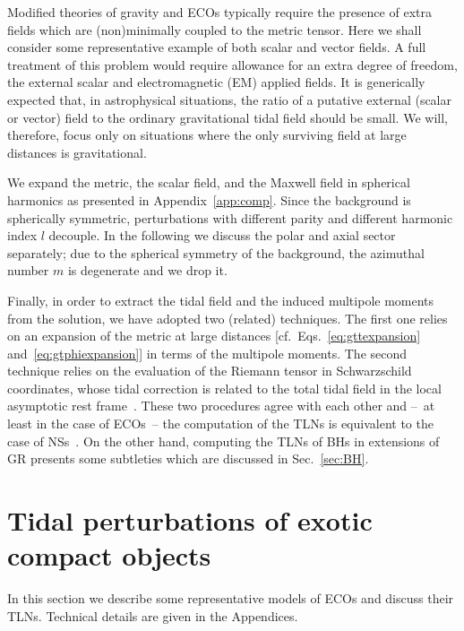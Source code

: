 \documentclass[aps,twocolumn,showpacs,preprintnumbers,nofootinbib,prd,superscriptaddress,groupedaddress,10pt]{revtex4-1}
\begin{document}
Modified theories of gravity and ECOs typically require the presence of extra fields which are (non)minimally coupled to the metric tensor. Here we shall consider some representative example of both scalar and vector fields.
A full treatment of this problem would require allowance for an extra degree of freedom, the external scalar and electromagnetic (EM) applied fields. It is generically expected that, in astrophysical situations, the ratio of a putative external (scalar or vector) field to the ordinary gravitational tidal field should be small. We will, therefore, focus only on situations where the only surviving field at large distances is gravitational.


We expand the metric, the scalar field, and the Maxwell field in spherical harmonics as presented in Appendix~\ref{app:comp}. Since the background is spherically symmetric, perturbations with different parity and different harmonic index $l$ decouple. In the following we discuss the polar and axial sector separately; due to the spherical symmetry of the background, the azimuthal
number $m$ is degenerate and we drop it.

Finally, in order to extract the tidal field and the induced multipole moments from the solution, we have adopted two (related) techniques. The first one relies on an expansion of the metric at large distances [cf.~Eqs.~\eqref{eq:gttexpansion} and~\eqref{eq:gtphiexpansion}] in terms of the multipole moments. The second technique relies on the evaluation of the Riemann tensor in Schwarzschild coordinates, whose tidal correction is related to the total tidal field in the local asymptotic rest frame~\cite{Fang:2005qq}. 
% 
%
These two procedures agree with each other and --~at least in the case of ECOs~-- the computation of the TLNs is equivalent to the case of NSs~\cite{Hinderer:2007mb,Binnington:2009bb}. On the other hand, computing the TLNs of BHs in extensions of GR presents some subtleties which are discussed in Sec.~\ref{sec:BH}.

\section{Tidal perturbations of exotic compact objects} \label{sec:ECOs}
In this section we describe some representative models of ECOs and discuss their TLNs. Technical details are given in the Appendices.

\end{document}
